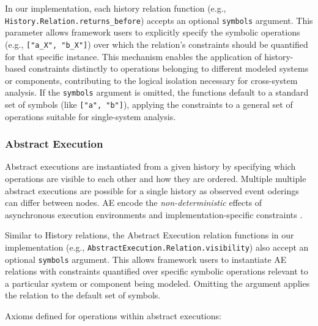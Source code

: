 In our implementation, each history relation function (e.g.,
\texttt{History.Relation.returns\_before})
accepts an optional \texttt{symbols} argument. This parameter allows
framework users to
explicitly specify the symbolic operations (e.g., \texttt{["a\_X",
"b\_X"]}) over which
the relation's constraints should be quantified for that specific instance. This
mechanism enables the application of history-based constraints distinctly to
operations belonging to different modeled systems or components, contributing to
the logical isolation necessary for cross-system analysis. If the
\texttt{symbols} argument
is omitted, the functions default to a standard set of symbols (like
\texttt{["a", "b"]}),
applying the constraints to a general set of operations suitable for
single-system analysis.

\subsubsection{Abstract Execution}

%
%

Abstract executions are instantiated from a given history by specifying which
operations are visible to each other and how they are ordered. Multiple multiple
abstract executions are possible for a single history as observed event oderings
can differ between nodes. AE encode the \textit{non-deterministic} effects of
asynchronous execution environments and implementation-specific constraints
\cite{burckhardt2014principles} \cite{viotti2016consistency}.

Similar to History relations, the Abstract Execution relation functions in our
implementation (e.g., \texttt{AbstractExecution.Relation.visibility})
also accept an
optional \texttt{symbols} argument. This allows framework users to
instantiate AE
relations with constraints quantified over specific symbolic operations relevant
to a particular system or component being modeled. Omitting the argument applies
the relation to the default set of symbols.

Axioms defined for operations within abstract executions:

